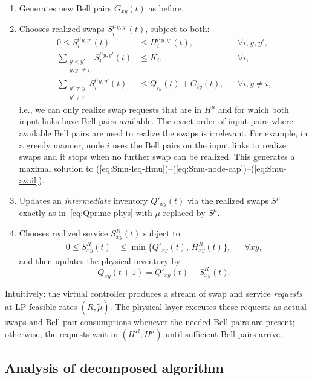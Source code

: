 \documentclass[11pt]{article}
\begin{document}
\begin{enumerate}[leftmargin=2em,label=(\roman*)]
\item Generates new Bell pairs $G_{xy}(t)$ as before.
\item Chooses realized swaps $S^\mu_i{}^{y,y'}(t)$, subject to both:
  \begin{align}
  0 \le S^\mu_i{}^{y,y'}(t) &\le H^\mu_i{}^{y,y'}(t),
  && \forall i,y,y', \label{eq:Smu-leq-Hmu}\\
  \sum_{\substack{y<y'\\ y,y'\neq i}} S^\mu_i{}^{y,y'}(t)
  &\le K_i,
  && \forall i,
  \label{eq:Smu-node-cap}\\
  \sum_{\substack{y'\neq y\\ y'\neq i}} S^\mu_i{}^{y,y'}(t)
  &\le Q_{iy}(t)+G_{iy}(t),
  && \forall i,y\neq i,
  \label{eq:Smu-avail}
  \end{align}
  i.e., we can only realize swap requests that are in $H^\mu$ and for which both input links
  have Bell pairs available. The exact order of input pairs where available Bell pairs are used to realize the swaps is irrelevant. For example, in a greedy manner, node $i$ uses the Bell pairs on the input links to realize swaps and it stops when no further swap can be realized. This generates a maximal solution to 
  (\ref{eq:Smu-leq-Hmu})--(\ref{eq:Smu-node-cap})--(\ref{eq:Smu-avail}).
   
\item Updates an \emph{intermediate} inventory
  $Q'_{xy}(t)$ via the realized swaps $S^\mu$ exactly as in~\eqref{eq:Qprime-phys} with
  $\mu$ replaced by $S^\mu$.
\item Chooses realized service $S^R_{xy}(t)$ subject to
  \begin{align}
  0 \le S^R_{xy}(t)
  &\le \min\{Q'_{xy}(t),\,H^R_{xy}(t)\},
  && \forall xy,
  \label{eq:SR-leq-HR}
  \end{align}
  and then updates the physical inventory by
  \[
  Q_{xy}(t{+}1) = Q'_{xy}(t) - S^R_{xy}(t).
  \]
\end{enumerate}

Intuitively: the virtual controller produces a stream of swap and service \emph{requests} at
LP-feasible rates $(\tilde R,\tilde\mu)$.
The physical layer executes these requests as actual swaps and Bell-pair consumptions
whenever the needed Bell pairs are present; otherwise, the requests wait in $(H^R,H^\mu)$
until sufficient Bell pairs arrive.

\subsection{Analysis of decomposed algorithm }
\end{document}
